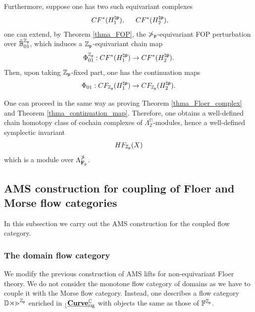 \documentclass[reqno, 10pt]{amsart}
\numberwithin{equation}{section}
\numberwithin{equation}{section}
\theoremstyle{definition}
\theoremstyle{remark}
\newcommand{\beqn}{\begin{equation*}}
\newcommand{\eeqn}{\end{equation*}}
\newcommand{\mb}{\mathbb}
\newcommand{\p}{{\sf p}}
\newcommand{\fp}{{\bf F}_{\sf p}}
\newcommand{\zp}{{{\mb Z}_{\sf p}}}
\renewcommand{\outer}{{}_{\lfloor}}
\newcommand{\uds}[1]{\underline{\smash{#1}}}
\begin{document}
Furthermore, suppose one has two such equivariant complexes 
\begin{align*}
&\ CF^*(H_1^{\natural \p}),\ &\ CF^*(H_2^{\natural \p}),
\end{align*}
one can extend, by Theorem \ref{thma_FOP}, the $\mb\Pi_\p$-equivariant FOP perturbation over $\tilde {\mb B}_{01}^{\zp}$, which induces a $\zp$-equivariant chain map
\beqn
\Phi_{01}^{\zp}: CF^*(H_1^{\natural \p}) \to CF^*(H_2^{\natural \p}).
\eeqn
Then, upon taking $\zp$-fixed part, one has the continuation maps
\beqn
\Phi_{01}: CF_{\zp}(H_1^{\natural \p}) \to CF_{\zp}(H_2^{\natural \p}).
\eeqn

One can proceed in the same way as proving Theorem \ref{thma_Floer_complex} and Theorem \ref{thma_continuation_map}. Therefore, one obtains a well-defined chain homotopy class of cochain complexes of $\Lambda_{\mb Z}^{\mb\Pi}$-modules, hence a well-defined symplectic invariant
\beqn
HF_{\zp}(X)
\eeqn
which is a module over $\Lambda_{\fp}^{\mb\Pi}$. 

\subsection{AMS construction for coupling of Floer and Morse flow categories}\label{subsection_AMS_equivariant_Floer}

In this subsection we carry out the AMS construction for the coupled flow category. 

\subsubsection{The domain flow category}

We modify the previous construction of AMS lifts for non-equivariant Floer theory. We do not consider the monotone flow category of domains as we have to couple it with the Morse flow category. Instead, one describes a flow category $\mb{Dom}^{\zp}$ enriched in $\outer \uds{\bf Curve}_{\rm rig}^{\mb C}$ with objects the same as those of ${\mb F}^{\zp}$.
\end{document}
